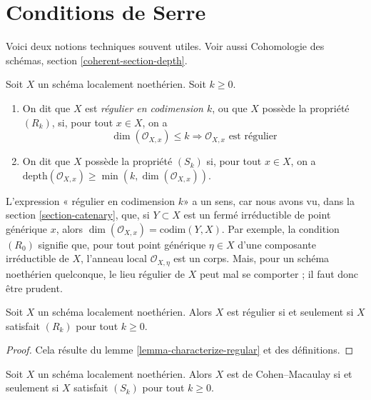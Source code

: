 \section{Conditions de Serre}
\label{section-Rk}

\noindent
Voici deux notions techniques souvent utiles. Voir
aussi Cohomologie des schémas, section \ref{coherent-section-depth}.

\begin{definition}
\label{definition-Rk}
Soit $X$ un schéma localement noethérien. Soit $k \geq 0$.
\begin{enumerate}
\item On dit que $X$ est {\it régulier en codimension $k$},
ou que $X$ possède la propriété {\it $(R_k)$}, si, pour tout $x \in X$,
on a
$$
\dim(\mathcal{O}_{X, x}) \leq k
\Rightarrow
\mathcal{O}_{X, x}\text{ est régulier}
$$
\item On dit que $X$ possède la propriété {\it $(S_k)$} si, pour tout $x \in X$, on a
$\text{depth}(\mathcal{O}_{X, x}) \geq \min(k, \dim(\mathcal{O}_{X, x}))$.
\end{enumerate}
\end{definition}

\noindent
L'expression « régulier en codimension $k$» a un sens, car nous avons vu, dans
la section \ref{section-catenary}, que, si $Y \subset X$ est un fermé
irréductible de point générique $x$, alors
$\dim(\mathcal{O}_{X, x}) = \text{codim}(Y, X)$. Par exemple, la condition
$(R_0)$ signifie que, pour tout point générique $\eta \in X$ d'une composante
irréductible de $X$, l'anneau local $\mathcal{O}_{X, \eta}$ est un
corps. Mais, pour un schéma noethérien quelconque, le lieu régulier
de $X$ peut mal se comporter ; il faut donc être prudent.

\begin{lemma}
\label{lemma-scheme-regular-iff-all-Rk}
Soit $X$ un schéma localement noethérien.
Alors $X$ est régulier si et seulement si $X$ satisfait $(R_k)$ pour tout $k \geq 0$.
\end{lemma}

\begin{proof}
Cela résulte du lemme \ref{lemma-characterize-regular} et des définitions.
\end{proof}

\begin{lemma}
\label{lemma-scheme-CM-iff-all-Sk}
Soit $X$ un schéma localement noethérien.
Alors $X$ est de Cohen--Macaulay si et seulement si $X$ satisfait $(S_k)$ pour tout $k \geq 0$.
\end{lemma}

